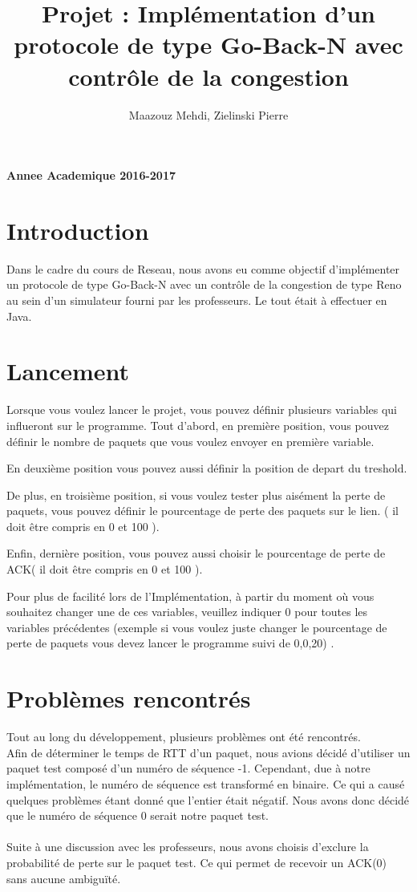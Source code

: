 \documentclass[a4paper,10pt]{article}
\title{Projet : Implémentation d'un protocole de type Go-Back-N avec contrôle de la congestion}
\author{Maazouz Mehdi, Zielinski Pierre}
\begin{document}
\maketitle
\textbf{Annee Academique 2016-2017}\\
\tableofcontents
\newpage

\section{Introduction}
Dans le cadre du cours de Reseau, nous avons eu comme objectif d'implémenter un protocole de type Go-Back-N
avec un contrôle de la congestion de type Reno au sein d'un simulateur fourni par les professeurs. Le tout était 
à effectuer en Java.

\section{Lancement}
Lorsque vous voulez lancer le projet, vous pouvez définir plusieurs variables qui influeront sur le programme.
Tout d'abord, en première position, vous pouvez définir le nombre de paquets que vous voulez envoyer en première variable.

En deuxième position vous pouvez aussi définir la position de depart du treshold.

De plus, en troisième position, si vous voulez tester plus aisément la perte de paquets, vous pouvez définir le pourcentage de perte des paquets sur le lien.
( il doit être compris en 0 et 100 ).

Enfin, dernière position, vous pouvez aussi choisir le pourcentage de perte de ACK( il doit être compris en 0 et 100 ).

Pour plus de facilité lors de l'Implémentation, à partir du moment où vous souhaitez changer une de ces variables, veuillez indiquer 0 pour toutes les variables précédentes (exemple si vous voulez juste changer le pourcentage de perte de paquets vous devez lancer le programme suivi de 0,0,20) .

\section{Problèmes rencontrés}
Tout au long du développement, plusieurs problèmes ont été rencontrés.\\
Afin de déterminer le temps de RTT d'un paquet, nous avions décidé d'utiliser un paquet test composé d'un numéro de séquence -1.
Cependant, due à notre implémentation, le numéro de séquence est transformé en binaire. Ce qui a causé quelques problèmes étant donné
que l'entier était négatif. Nous avons donc décidé que le numéro de séquence 0 serait notre paquet test.\\
\\
Suite à une discussion avec les professeurs, nous avons choisis d'exclure la probabilité de perte sur le paquet test.
Ce qui permet de recevoir un ACK(0) sans aucune ambiguïté.
\end{document}
